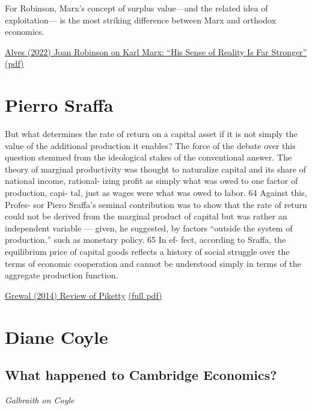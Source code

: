 \documentclass[
]{book}
\begin{document}
For Robinson, Marx's concept of surplus value---and the related idea of exploitation---
is the most striking difference between Marx and orthodox economics.

\href{https://www.aeaweb.org/articles?id=10.1257/jep.36.2.247}{Alves (2022) Joan Robinson on Karl Marx: ``His Sense of Reality Is Far Stronger''}
\href{pdf/Alves_2022_Joan_Robinson_on_Karl_Marx.pdf}{(pdf)}

\hypertarget{pierro-sraffa}{%
\section{Pierro Sraffa}\label{pierro-sraffa}}

But what determines the rate of return on a capital asset if it is not
simply the value of the additional production it enables? The force of
the debate over this question stemmed from the ideological stakes of
the conventional answer. The theory of marginal productivity was
thought to naturalize capital and its share of national income, rational-
izing profit as simply what was owed to one factor of production, capi-
tal, just as wages were what was owed to labor. 64 Against this, Profes-
sor Piero Sraffa's seminal contribution was to show that the rate of
return could not be derived from the marginal product of capital but
was rather an independent variable --- given, he suggested, by factors
``outside the system of production,'' such as monetary policy. 65 In ef-
fect, according to Sraffa, the equilibrium price of capital goods reflects
a history of social struggle over the terms of economic cooperation and
cannot be understood simply in terms of the aggregate production
function.

\href{https://harvardlawreview.org/2014/12/the-laws-of-capitalism/}{Grewal (2014) Review of Piketty}
\href{pdf/Grewal_2014_laws_of_Capitalism.pdf}{(full pdf)}

\hypertarget{diane-coyle}{%
\section{Diane Coyle}\label{diane-coyle}}

\hypertarget{what-happened-to-cambridge-economics}{%
\subsection{What happened to Cambridge Economics?}\label{what-happened-to-cambridge-economics}}

\emph{Galbraith on Coyle}
\end{document}

